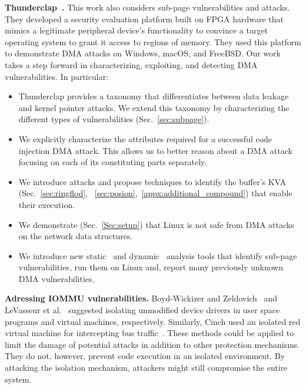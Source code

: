 \smallskip
\noindent\textbf{Thunderclap~\cite{thunder}.} This work also considers sub-page vulnerabilities and \simple attacks. They developed a security evaluation platform built on FPGA hardware that mimics a legitimate peripheral device's functionality to convince a target operating system to grant it access to regions of memory. They used this platform to demonstrate \simple DMA attacks on Windows, macOS, and FreeBSD.
Our work takes a step forward in characterizing, exploiting, and detecting DMA vulnerabilities. In particular:
\begin{itemize}

    \item Thunderclap provides a taxonomy that differentiates between data leakage and kernel pointer attacks. We extend this taxonomy by characterizing the different types of \subpage vulnerabilities (Sec.~\ref{sec:subpage}).
    
    \item We explicitly characterize the attributes required for a successful code injection DMA attack. This allows us to better reason about a DMA attack focusing on each of its constituting parts separately. 
    
    \item We introduce \compound attacks and propose techniques to identify the buffer's KVA (Sec.~\ref{sec:ringflod}, ~\ref{sec:posion},~\ref{appx:additional_compound}) that enable their execution.
    
    \item We demonstrate (Sec.~\ref{Sec:setup}) that Linux is not safe from DMA attacks on the network data structures.
    
    \item We introduce new static~\cite{SPADE} and dynamic~\cite{DKASAN} analysis tools that identify sub-page vulnerabilities, run them on Linux and, report many previously unknown DMA vulnerabilities.
    
\end{itemize}





\smallskip
\noindent\textbf{Adressing IOMMU vulnerabilities.}
Boyd-Wickizer and Zeldovich~\cite{BWZ10} and LeVasseur et al.~\cite{LUSG04} suggested isolating unmodified device drivers in user space programs and virtual machines, respectively. Similarly, Cinch used an isolated red virtual machine for intercepting bus traffic~\cite{AWH16}. These methods could be applied to limit the damage of potential attacks in addition to other protection mechanisms. They do not, however, prevent code execution in an isolated environment. By attacking the isolation mechanism, attackers might still compromise the entire system.

